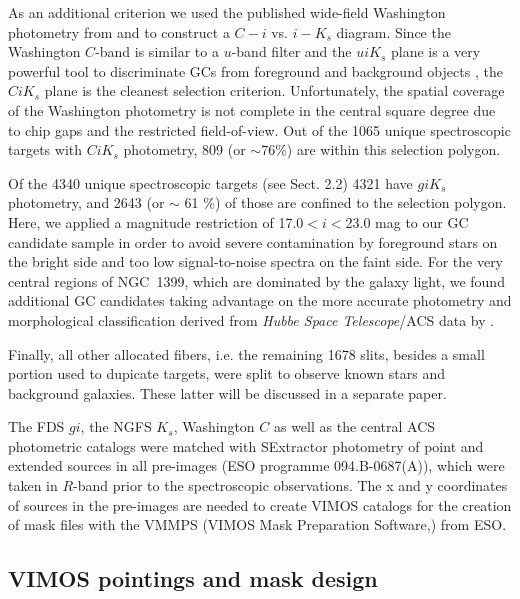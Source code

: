 \documentclass[useAMS,usenatbib]{mn2e}
\begin{document}
As an additional criterion we used the published wide-field Washington 
photometry from \citet{Dirsch04} and \citet{Bassino} to construct a $C-i$ vs. 
$i-K_s$ diagram. Since the Washington $C$-band is similar to a $u$-band filter 
and the $uiK_s$ plane is a very powerful tool to discriminate GCs from 
foreground and background objects \citep{Munoz14}, the $CiK_s$ plane is the 
cleanest selection criterion. Unfortunately, the spatial coverage of the 
Washington photometry is not complete in the central square degree due to chip 
gaps and the restricted field-of-view. Out of the 1065 unique spectroscopic 
targets with $CiK_s$ photometry, 809 (or $\sim$76\%) are within this selection 
polygon.

Of the 4340 unique spectroscopic targets (see Sect. 2.2) 4321 have $giK_s$ 
photometry, and 2643 (or $\sim$ 61 \%) of those are confined to the selection 
polygon. 
Here, we applied a magnitude restriction of 17.0$<i<$23.0 mag to our GC 
candidate sample in order to avoid severe contamination by foreground stars on 
the bright side and too low signal-to-noise spectra on the faint side. 
For the very central regions of NGC~1399, which are dominated by the galaxy 
light, we found additional GC candidates taking advantage on the more accurate 
photometry and morphological classification derived from {\it Hubbe Space 
Telescope}/ACS data by \citet{Puzia14}.

Finally, all other allocated fibers, i.e. the remaining 1678 slits, besides a 
small portion used to dupicate targets, were split to observe known stars and 
background galaxies. These latter will be discussed in a separate paper. 

The FDS $gi$, the NGFS $K_s$, Washington $C$ as well as the central ACS  
photometric catalogs were matched with SExtractor photometry of point and 
extended sources in all pre-images (ESO programme 094.B-0687(A)), which were 
taken in $R$-band prior to the spectroscopic observations. The x and y 
coordinates of sources in the pre-images are needed to create VIMOS catalogs 
for the creation of mask files with the VMMPS (VIMOS Mask Preparation 
Software,\citealt{Bottini05}) from ESO.

\subsection{VIMOS pointings and mask design}
\label{sec:VIMOSpointings}
\end{document}
